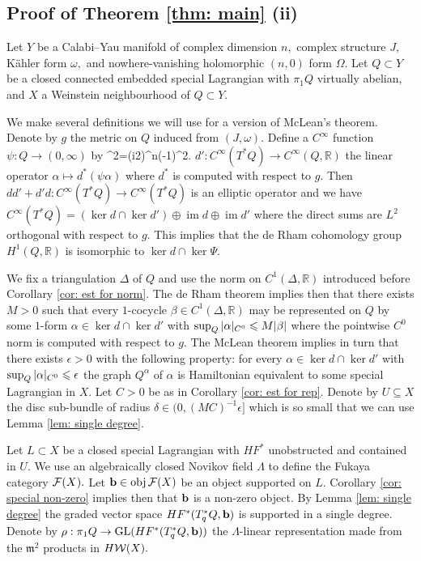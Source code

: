 \documentclass{article}
\DeclareMathOperator{\im}{im}\DeclareMathOperator{\coker}{coker}
\theoremstyle{plain}%
\theoremstyle{definition}
\numberwithin{equation}{section}
\numberwithin{figure}{section}
\def\e#1\e{\begin{equation}#1\end{equation}}
\def\l{\label}
\def\fm{{\mathfrak m}}
\def\GL{\mathop{\rm GL}}
\def\le{\leqslant\nobreak}
\def\cF{{\mathbin{\cal F}}}
\def\cW{{\mathbin{\cal W}}}
\def\R{{\mathbin{\mathbb R}}}
\def\al{\alpha}
\def\be{\beta}
\def\de{\delta}
\def\ep{\epsilon}
\def\om{\omega}
\def\ps{\psi}
\def\Ps{\Psi}
\def\r{\rho}
\def\De{\Delta}
\def\La{\Lambda}
\def\Om{\Omega}
\def\ov{\overline}
\def\iy{\infty}
\def\sb{\subseteq}
\begin{document}
\subsection{Proof of Theorem \ref{thm: main} (ii)}\l{sec: proof abelian}
Let $Y$ be a Calabi--Yau manifold of complex dimension $n,$ complex structure $J,$ K\"ahler form $\om,$ and nowhere-vanishing holomorphic $(n,0)$ form $\Om.$ Let $Q\subset Y$ be a closed connected embedded special Lagrangian with $\pi_1Q$ virtually abelian, and $X$ a Weinstein neighbourhood of $Q\subset Y.$ 

We make several definitions we will use for a version \cite[Proposition 2.13]{J5} of McLean's theorem. Denote by $g$ the metric on $Q$ induced from $(J,\om).$ Define a $C^\iy$ function $\ps:Q\to(0,\iy)$ by
\e\l{ps}\ps^2\frac{\om^n}{n!}=\Bigl(\frac i2\Bigr)^n(-1)^{2}\Om\wedge\ov\Om.\e
Denote by $d': C^\iy(T^*Q)\to C^\iy(Q,\R)$ the linear operator $\al\mapsto d^*(\ps \al)$ where $d^*$ is computed with respect to $g.$ Then $dd'+d'd:C^\iy(T^*Q)\to C^\iy(T^*Q)$ is an elliptic operator and we have $C^\iy(T^*Q)=(\ker d\cap\ker d')\oplus\im d\oplus \im d'$
where the direct sums are $L^2$ orthogonal with respect to $g.$ This implies that the de Rham cohomology group $H^1(Q,\R)$ is isomorphic to $\ker d\cap\ker\Ps.$ 

We fix a triangulation $\De$ of $Q$ and use the norm on $C^1(\De,\R)$ introduced before Corollary \ref{cor: est for norm}. The de Rham theorem implies then that there exists $M>0$ such that every $1$-cocycle $\be\in C^1(\De,\R)$ may be represented on $Q$ by some $1$-form $\al\in\ker d\cap\ker d'$ with $\sup_Q|\al|_{C^0}\le M|\be|$ where the pointwise $C^0$ norm is computed with respect to $g.$ The McLean theorem \cite[Proposition 2.13]{J5} implies in turn that there exists $\ep>0$ with the following property: for every $\al\in\ker d\cap\ker d'$ with $\sup_Q|\al|_{C^0}\le\ep$ the graph $Q^\al$ of $\al$ is Hamiltonian equivalent to some special Lagrangian in $X.$ Let $C>0$ be as in Corollary \ref{cor: est for rep}. Denote by $U\sb X$ the disc sub-bundle of radius $\de\in(0,(MC)^{-1}\ep]$ which is so small that we can use Lemma \ref{lem: single degree}.

Let $L\subset X$ be a closed special Lagrangian with $HF^*$ unobstructed and contained in $U.$ We use an algebraically closed Novikov field $\La$ to define the Fukaya category $\cF(X).$ Let $\b\in\obj\cF(X)$ be an object supported on $L.$ Corollary \ref{cor: special non-zero} implies then that ${\mathbf{b}}$ is a non-zero object. By Lemma \ref{lem: single degree} the graded vector space $HF^*(T_q^*Q,{\mathbf{b}})$ is supported in a single degree. Denote by $\r:\pi_1Q\to \GL (HF^*(T_q^*Q,\b))$ the $\La$-linear representation made from the $\fm^2$ products in $H\cW(X).$ 
\end{document}
